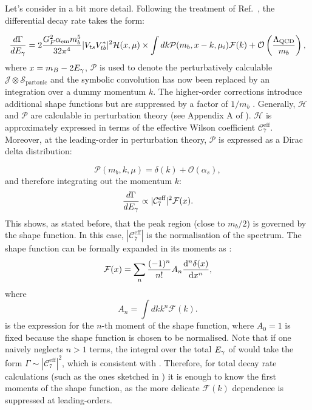 Let's consider  in a bit more detail.
Following the treatment of Ref.~\cite{Ligeti:2008ac}, the differential decay rate takes the form:

\begin{equation}\label{eq:differential_decay_simba}
    \frac{d\Gamma}{dE_{\gamma}} = 2\frac{G_F^2\alpha_{\mathrm{em}} m_b^5}{32\pi^4}|V_{ts}V_{tb}^*|^2 \mathcal{H}(x, \mu) \times \int dk \mathcal{P}(m_b, x - k, \mu_i) \mathcal{F}(k) + {\cal O}\left(\frac{\Lambda_{\mathrm{QCD}}}{m_b}\right),
\end{equation}
where $x=m_B-2{E_{\gamma}}$, $\mathcal{P}$ is used to denote the perturbatively calculable $\mathcal{J}\otimes\mathcal{S_{\mathrm{partonic}}}$ and the symbolic convolution has now been replaced by an integration over a dummy momentum $k$.
The higher-order corrections introduce additional shape functions but are suppressed by a factor of $1/m_b$ \cite{Neubert:2002yx}.
Generally, $\mathcal{H}$ and $\mathcal{P}$ are calculable in perturbation theory (see Appendix A of \cite{Ligeti:2008ac}).
$\mathcal{H}$ is approximately expressed in terms of the effective Wilson coefficient $\mathcal{C}_7^{\mathrm{eff}}$. 
Moreover, at the leading-order in perturbation theory, $\mathcal{P}$ is expressed as a Dirac delta distribution:

\begin{equation}
    \mathcal{P}(m_b,k,\mu) = \delta(k) + \mathcal{O}(\alpha_s),
\end{equation}
and therefore integrating out the momentum $k$:
\begin{equation}\label{eq:integrated_egamma}
    \frac{d\Gamma}{d{E_{\gamma}}} \propto |\mathcal{C}_7^{\mathrm{eff}}|^2 \mathcal{F}(x).
\end{equation}
This shows, as stated before, that the peak region (close to $m_b/2$) is governed by the shape function.
In this case, $|\mathcal{C}_7^{\mathrm{eff}}|$ is the normalisation of the spectrum.
The shape function can be formally expanded in its moments as \cite{PhysRevD.50.2037,Ligeti:2008ac}:
\begin{equation}\label{eq:shape_function_expansion}
    \mathcal{F}(x) = \sum_n \frac{(-1)^n}{n!} A_n \dv[n]{\delta(x)}{x},
\end{equation}
where 
\begin{equation}\label{eq:moments_of_shape_function}
    A_n = \int dk k^n \mathcal{F}(k).
\end{equation}
 is the expression for the $n$-th moment of the shape function, where 
$A_0=1$ is fixed because the shape function is chosen to be normalised.
Note that if one naively neglects $n>1$ terms, the integral over the total ${E_{\gamma}}$ of  would take the form $\Gamma\sim|\mathcal{C}_7^{\mathrm{eff}}|^2$, which is consistent with .
Therefore, for total decay rate calculations (such as the ones sketched in ) it is enough to know the first moments of the shape function, as the more delicate $\mathcal{F}(k)$ dependence is suppressed at leading-orders.

